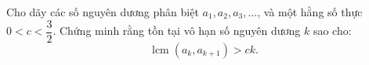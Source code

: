 \ifshowproblem
\begin{problem}\label{example:CHN-2015-TST1-P2}
	Cho dãy các số nguyên dương phân biệt \( a_1, a_2, a_3, \ldots \), và một hằng số thực \( 0 < c < \dfrac{3}{2} \).  
	Chứng minh rằng tồn tại vô hạn số nguyên dương \( k \) sao cho:
	\[
		\operatorname{lcm}(a_k, a_{k+1}) > c k.
	\]
\end{problem}
\fi

\footnotemark
{}
\fi